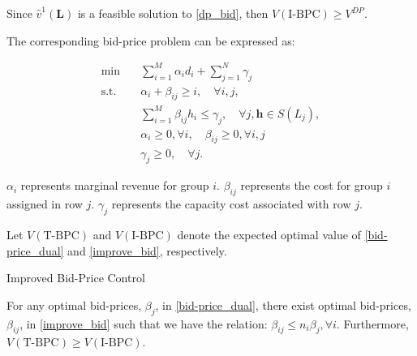 Since $\hat{v}^{1}(\bm{L})$ is a feasible solution to \eqref{dp_bid}, then $V(\text{I-BPC}) \geq V^{DP}$.

The corresponding bid-price problem can be expressed as:

\begin{equation}\label{improve_bid}
    \begin{aligned}
    \min \quad & \sum_{i=1}^M \alpha_i d_i+ \sum_{j=1}^N \gamma_j \\
    \mathrm{s.t.} \quad & \alpha_i+\beta_{i j} \geq i, \quad \forall i, j, \\
    & \sum_{i=1}^M \beta_{i j} h_i \leq \gamma_j, \quad \forall j, \bm{h} \in S(L_j), \\
    & \alpha_i \geq 0, \forall i, \quad \beta_{ij} \geq 0, \forall i, j \\
    & \gamma_j \geq 0, \quad \forall j.
    \end{aligned}
\end{equation}

$\alpha_{i}$ represents marginal revenue for group $i$. $\beta_{ij}$ represents the cost for group $i$ assigned in row $j$. $\gamma_{j}$ represents the capacity cost associated with row $j$.

Let $V(\text{T-BPC})$ and $V(\text{I-BPC})$ denote the expected optimal value of \eqref{bid-price_dual} and \eqref{improve_bid}, respectively.



\begin{algorithm}[H]
    \caption{Improved Bid-Price Control}\label{algo_improve_bid}
\end{algorithm}

\begin{lem}\label{BPC_relation}
    For any optimal bid-prices, $\beta_{j}$, in \eqref{bid-price_dual}, there exist optimal bid-prices, $\beta_{ij}$, in \eqref{improve_bid} such that we have the relation:
    $\beta_{ij} \leq n_{i} \beta_{j}, \forall i$. Furthermore, $V(\text{T-BPC}) \geq V(\text{I-BPC})$.
    \end{lem}
    
